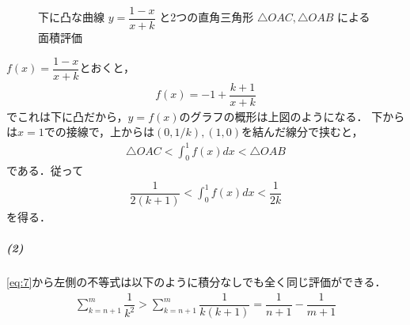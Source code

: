 \documentclass[../../main.tex]{subfiles}
\begin{document}
\begin{figure}[htb]
\begin{tikzpicture}[x=4.5cm, y=5.0cm, >=stealth, every node/.style={font=\small}]
  \end{tikzpicture}
  \caption{下に凸な曲線 $y = \dfrac{1-x}{x+k}$ と2つの直角三角形 $\triangle OAC, \triangle OAB$ による面積評価}
  \label{fig:alternative_integral_triangle_evaluation}
\end{figure}

$f(x)=\dfrac{1-x}{x+k}$とおくと，
\begin{align}
  f(x) =  -1 + \dfrac{k+1}{x+k}
\end{align}
でこれは下に凸だから，$y=f(x)$のグラフの概形は上図のようになる．
下からは$x=1$での接線で，上からは$(0,1/k),(1,0)$を結んだ線分で挟むと，
\begin{align}
  \triangle OAC < \int_{0}^{1}f(x)dx < \triangle OAB
\end{align}
である．従って
\begin{align}
  \dfrac{1}{2(k+1)} < \int_{0}^{1}f(x)dx < \dfrac{1}{2k}
\end{align}
を得る．

\subparagraph{(2)}
\cref{eq:7}から左側の不等式は以下のように積分なしでも全く同じ評価ができる．
\begin{align}
  \sum_{k=n+1}^{m} \dfrac{1}{k^2} > \sum_{k=n+1}^{m} \dfrac{1}{k(k+1)} = \dfrac{1}{n+1} - \dfrac{1}{m+1}
\end{align}
\end{document}
